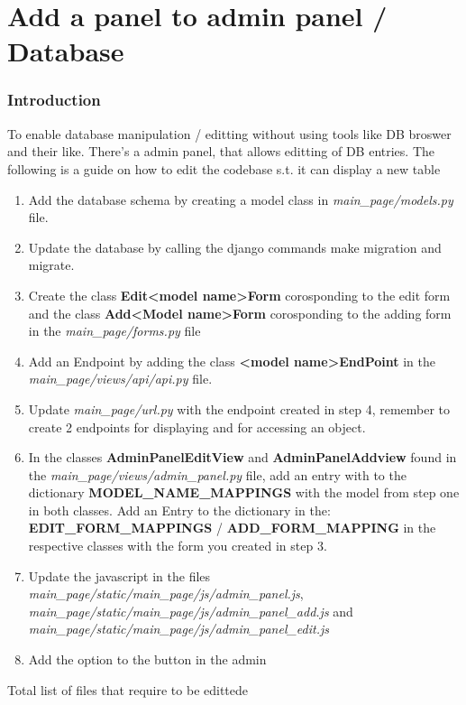 \documentclass{article}
\begin{document}
\section{Add a panel to admin panel / Database}

\subsubsection*{Introduction}
To enable database manipulation / editting without using tools like DB broswer and their like. There's a admin panel, that allows editting of DB entries. The following is a guide on how to edit the codebase s.t. it can display a new table

\begin{enumerate}
	\item Add the database schema by creating a model class in \textit{main\_page/models.py} file.
	\item Update the database by calling the django commands make migration and migrate.
	\item Create the class \textbf{Edit<model name>Form} corosponding to the edit form and the class \textbf{Add<Model name>Form} corosponding to the adding form in the \textit{main\_page/forms.py} file
	\item Add an Endpoint by adding the class \textbf{<model name>EndPoint} in the \textit{main\_page/views/api/api.py} file.
	\item Update \textit{main\_page/url.py} with the endpoint created in step 4, remember to create 2 endpoints for displaying and for accessing an object. 
	\item In the classes \textbf{AdminPanelEditView} and \textbf{AdminPanelAddview} found in the \textit{main\_page/views/admin\_panel.py} file, add an entry with to the dictionary \textbf{MODEL\_NAME\_MAPPINGS} with the model from step one in both classes. Add an Entry to the dictionary in the:\\ \textbf{EDIT\_FORM\_MAPPINGS} / \textbf{ADD\_FORM\_MAPPING} in the respective classes with the form you created in step 3.
	 \item Update the javascript in the files \textit{main\_page/static/main\_page/js/admin\_panel.js}, \textit{main\_page/static/main\_page/js/admin\_panel\_add.js} and\\ \textit{main\_page/static/main\_page/js/admin\_panel\_edit.js}
	 \item Add the option to the button in the admin
\end{enumerate} 
Total list of files that require to be edittede 
\end{document}
